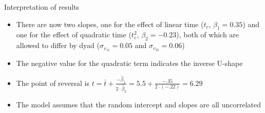 \documentclass[aspectratio=169]{beamer}
\begin{document}
\begin{frame}{Interpretation of results}
\begin{itemize}
  \item There are now two slopes, one for the effect of linear time ($t_c$,
  $\beta_1 = 0.35$) and one for the effect of quadratic time ($t_c^2$,
  $\beta_2 = -0.23$), both of which are allowed to differ by dyad
  ($\sigma_{\upsilon_{1i}} = 0.05$ and $\sigma_{\upsilon_{2i}} = 0.06$)
  \item The negative value for the quadratic term indicates the inverse
  U-shape
  \item The point of reversal is $t = \bar t + \frac{-\hat\beta_1}{2\cdot\hat\beta_2} =
  5.5 + \frac{-.35}{2\cdot(-.22)} = 6.29$ \item The model assumes that the
  random intercept and slopes are all
  uncorrelated
\end{itemize}
\end{frame}
\end{document}
